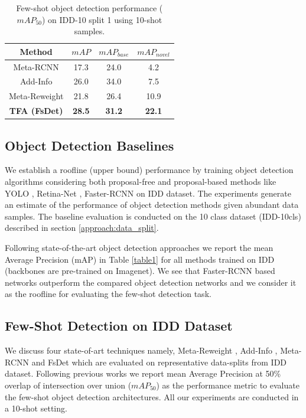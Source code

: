 \documentclass[letterpaper]{article} %
\begin{document}
\begin{table}[tp]
\caption{Few-shot object detection performance ($mAP_{50}$) on IDD-10 split 1 using 10-shot samples.}
\centering
\begin{tabular}{c|c|c|c}
\hline
Method                       & $mAP$ & $mAP_{base}$ & $mAP_{novel}$ \\
\hline
Meta-RCNN     & 17.3  & 24.0         & 4.2   \\
Add-Info      & 26.0  & 34.0         & 7.5   \\
Meta-Reweight & 21.8     & 26.4       & 10.9 \\
\textbf{TFA (FsDet)}       & \textbf{28.5}  & \textbf{31.2} & \textbf{22.1} \\
\hline
\end{tabular}
\label{table3}
\end{table}

\subsection{Object Detection Baselines}
\label{experiment:od_base}
We establish a roofline (upper bound) performance by training object detection algorithms considering both proposal-free and proposal-based methods like YOLO \cite{yolo1}, Retina-Net \cite{retinanet}, Faster-RCNN \cite{faster-rcnn} on IDD dataset. The experiments generate an estimate of the performance of object detection methods given abundant data samples. The baseline evaluation is conducted on the 10 class dataset (IDD-10cls) described in section \ref{approach:data_split}.

Following state-of-the-art object detection approaches we report the mean Average Precision (mAP) in Table \ref{table1} for all methods trained on IDD (backbones are pre-trained on Imagenet). We see that Faster-RCNN based networks outperform the compared object detection networks and we consider it as the roofline for evaluating the few-shot detection task.

\subsection{Few-Shot Detection on IDD Dataset}
\label{experiment:fsod_res}
We discuss four state-of-art techniques namely, Meta-Reweight \cite{reweight}, Add-Info \cite{addfeat}, Meta-RCNN \cite{metarcnn} and FsDet \cite{fsdet} which are evaluated on representative data-splits from IDD dataset. Following previous works we report mean Average Precision at 50\% overlap of intersection over union ($mAP_{50}$) as the performance metric to evaluate the few-shot object detection architectures. All our experiments are conducted in a 10-shot setting.
\end{document}
